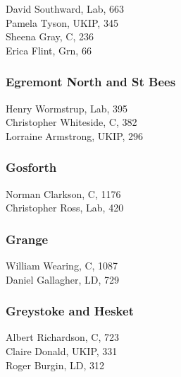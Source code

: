 \documentclass[a4paper,openany,10pt]{book}
\begin{document}


David Southward, Lab, 663\\
Pamela Tyson, UKIP, 345\\
Sheena Gray, C, 236\\
Erica Flint, Grn, 66\\


\subsubsection*{Egremont North and St Bees}



Henry Wormstrup, Lab, 395\\
Christopher Whiteside, C, 382\\
Lorraine Armstrong, UKIP, 296\\


\subsubsection*{Gosforth}



Norman Clarkson, C, 1176\\
Christopher Ross, Lab, 420\\


\subsubsection*{Grange}



William Wearing, C, 1087\\
Daniel Gallagher, LD, 729\\


\subsubsection*{Greystoke and Hesket}



Albert Richardson, C, 723\\
Claire Donald, UKIP, 331\\
Roger Burgin, LD, 312\\
\end{document}
